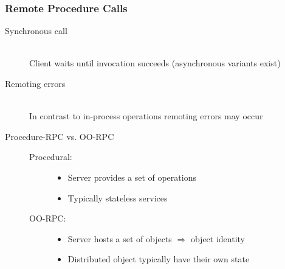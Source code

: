 \documentclass[10pt]{article}
\newcommand{\Ra}{\Rightarrow}
\begin{document}
\subsubsection{Remote Procedure Calls}
\begin{description}
	\item[Synchronous call] \hfill \\
		Client waits until invocation succeeds (asynchronous variants exist)
	\item[Remoting errors] \hfill \\
		In contrast to in-process operations remoting errors may occur
	\item[Procedure-RPC vs. OO-RPC] \hfill
		\begin{description}
			\item[Procedural:] \hfill
				\begin{itemize}
					\item  Server provides a set of operations
					\item Typically stateless services
				\end{itemize}
			\item[OO-RPC:] \hfill
				\begin{itemize}
					\item  Server hosts a set of objects $\Ra$ object identity
					\item Distributed object typically have their own state
 				\end{itemize}
		\end{description}
\end{description}
\end{document}
